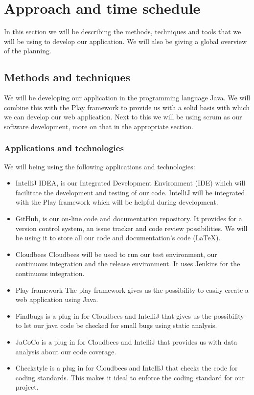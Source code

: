 \documentclass[]{article}
\begin{document}
\section{Approach and time schedule}
In this section we will be describing the methods, techniques and tools that we will be using to develop our application. We will also be giving a global overview of the planning.

\subsection{Methods and techniques}
We will be developing our application in the programming language Java. We will combine this with the Play framework to provide us with a solid basis with which we can develop our web application. Next to this we will be using scrum as our software development, more on that in the appropriate section.

\subsubsection{Applications and technologies}
We will being using the following applications and technologies:
\begin{itemize}
\item IntelliJ IDEA, is our Integrated Development Environment (IDE) which will facilitate the development and testing of our code.
IntelliJ will be integrated with the Play framework which will be helpful during development.
\item GitHub, is our on-line code and documentation repository.
It provides for a version control system, an issue tracker and code review possibilities.
We will be using it to store all our code and documentation's code (LaTeX).
\item Cloudbees
Cloudbees will be used to run our test environment, our continuous integration and the release environment.
It uses Jenkins for the continuous integration.
\item Play framework
The play framework gives us the possibility to easily create a web application using Java.
\item Findbugs is a plug in for Cloudbees and IntelliJ that gives us the possibility to let our java code be checked for small bugs using static analysis.
\item JaCoCo is a plug in for Cloudbees and IntelliJ that provides us with data analysis about our code coverage.
\item Checkstyle is a plug in for Cloudbees and IntelliJ that checks the code for coding standards.
This makes it ideal to enforce the coding standard for our project.
\end{itemize}
\end{document}
